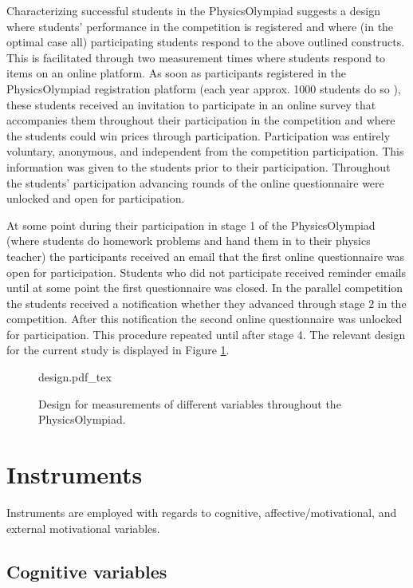 \documentclass[]{interact}
\begin{document}
Characterizing successful students in the PhysicsOlympiad suggests a design where students' performance in the competition is registered and where (in the optimal case all) participating students respond to the above outlined constructs. This is facilitated through two measurement times where students respond to items on an online platform. As soon as participants registered in the PhysicsOlympiad registration platform (each year approx. 1000 students do so \citep{Petersen.2017}), these students received an invitation to participate in an online survey that accompanies them throughout their participation in the competition and where the students could win prices through participation. Participation was entirely voluntary, anonymous, and independent from the competition participation. This information was given to the students prior to their participation. Throughout the students' participation advancing rounds of the online questionnaire were unlocked and open for participation. 

At some point during their participation in stage 1 of the PhysicsOlympiad (where students do homework problems and hand them in to their physics teacher) the participants received an email that the first online questionnaire was open for participation. Students who did not participate received reminder emails until at some point the first questionnaire was closed. In the parallel competition the students received a notification whether they advanced through stage 2 in the competition. After this notification the second online questionnaire was unlocked for participation. This procedure repeated until after stage 4. The relevant design for the current study is displayed in Figure \ref{Design}.

\begin{figure}
\centering
{design.pdf_tex}
\caption{Design for measurements of different variables throughout the PhysicsOlympiad.}
\label{Design}
\end{figure}


\section{Instruments}

Instruments are employed with regards to cognitive, affective/motivational, and external motivational variables. 

\subsection{Cognitive variables}
\end{document}
